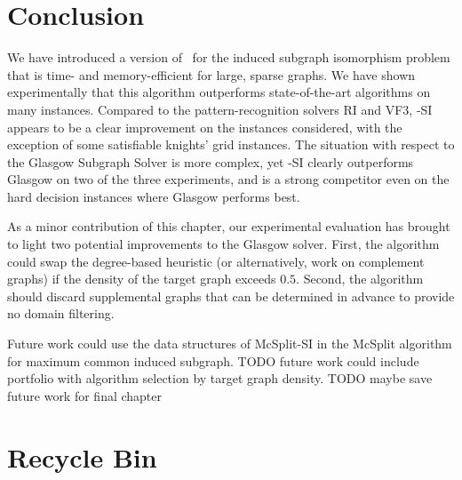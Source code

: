 \section{Conclusion}\label{sec:mcsplit-si-conclusion}

We have introduced a version of \McSplit\ for the induced subgraph isomorphism problem that is time- and memory-efficient for large, sparse graphs.
We have shown experimentally that this algorithm outperforms state-of-the-art algorithms on many instances.
Compared to the pattern-recognition solvers RI and VF3, \McSplit-SI appears to be a clear improvement
on the instances considered, with the exception of some satisfiable knights' grid instances.  The situation
with respect to the Glasgow Subgraph Solver is more complex, yet \McSplit-SI clearly outperforms Glasgow on
two of the three experiments, and is a strong competitor even on the hard decision instances
where Glasgow performs best.

As a minor contribution of this chapter, our experimental evaluation has
brought to light two potential improvements to the Glasgow solver.  First, the
algorithm could swap the degree-based heuristic (or alternatively, work on
complement graphs) if the density of the target graph exceeds $0.5$.  Second,
the algorithm should discard supplemental graphs that can be determined in
advance to provide no domain filtering.

Future work could use the data structures of McSplit-SI in the McSplit algorithm for maximum common induced subgraph.
TODO future work could include portfolio with algorithm selection by target graph density.
TODO maybe save future work for final chapter

\section{Recycle Bin}

